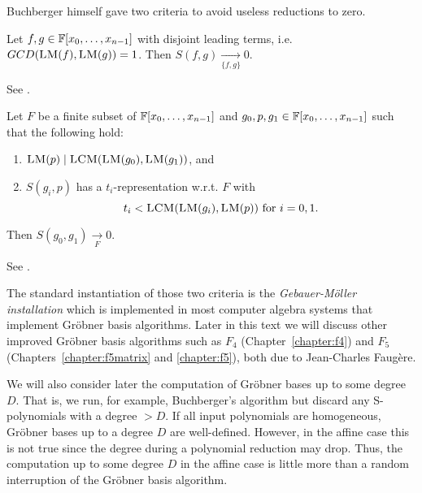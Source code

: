Buchberger himself gave two criteria to avoid useless reductions to zero.

\begin{definition}
Let $f,g \in \mathbb{F}[x_0,\dots,x_{n-1}]$ with disjoint leading terms, i.e.\ $GCD(\textsc{LM}(f),\textsc{LM}(g)) = 1$. Then $S(f,g) \underset{\{f,g\}}{\longrightarrow} 0$.
\label{def:buchberger_first_criterion}
\end{definition}

\begin{citeproof}
See \cite[p.222]{Becker1991}. 
\end{citeproof}

\begin{definition}
Let $F$ be a finite subset of $\mathbb{F}[x_0,\dots,x_{n-1}]$ and $g_0, p, g_1 \in \mathbb{F}[x_0,\dots,x_{n-1}]$ such that the following hold:
\begin{enumerate}
 \item $\textsc{LM}(p) \mid \textsc{LCM}(\textsc{LM}(g_0),\textsc{LM}(g_1))$, and
 \item $S(g_i,p)$ has a $t_i$-representation w.r.t. $F$ with \[t_i < \textsc{LCM}(\textsc{LM}(g_i),\textsc{LM}(p)) \textnormal{ for } i = 0,1.\]
\end{enumerate}
Then $S(g_0,g_1) \underset{F}{\longrightarrow} 0$.
\label{def:buchberger_second_criterion}
\end{definition}

\begin{citeproof}
See \cite[p.224ff]{Becker1991}. 
\end{citeproof}

The standard instantiation of those two criteria is the \emph{Gebauer-Möller installation} \cite{Gebauer1988} which is implemented in most computer algebra systems that implement Gröbner basis algorithms. Later in this text we will discuss other improved Gröbner basis algorithms such as $F_4$ (Chapter~\ref{chapter:f4}) and $F_5$ (Chapters~\ref{chapter:f5matrix} and \ref{chapter:f5}), both due to Jean-Charles Faugère.

We will also consider later the computation of Gröbner bases up to some degree $D$. That is, we run, for example, Buchberger's algorithm but discard any S-polynomials with a degree $> D$. If all input polynomials are homogeneous, Gröbner bases up to a degree $D$ are well-defined. However, in the affine case this is not true since the degree during a polynomial reduction may drop. Thus, the computation up to some degree $D$ in the affine case is little more than a random interruption of the Gröbner basis algorithm.

